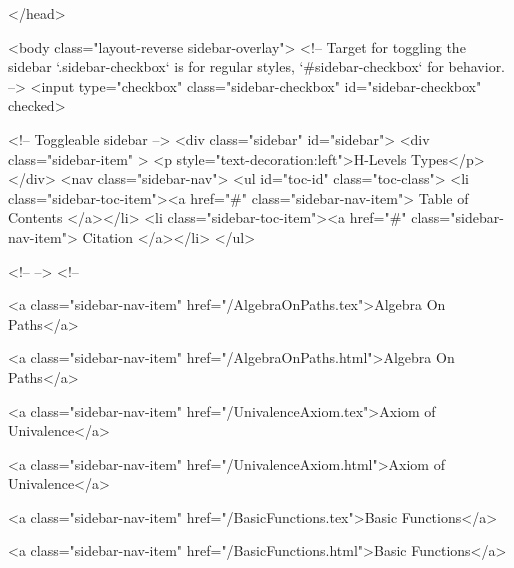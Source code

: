   
</head>




  <body class="layout-reverse sidebar-overlay">
    <!-- Target for toggling the sidebar `.sidebar-checkbox` is for regular
     styles, `#sidebar-checkbox` for behavior. -->
<input type="checkbox" class="sidebar-checkbox" id="sidebar-checkbox" checked>

<!-- Toggleable sidebar -->
<div class="sidebar" id="sidebar">
  <div class="sidebar-item" >
    <p style="text-decoration:left">H-Levels Types</p>
  </div>
  <nav class="sidebar-nav">
    <ul id="toc-id" class="toc-class">
  <li class="sidebar-toc-item"><a href="#" class="sidebar-nav-item"> Table of Contents </a></li>
  <li class="sidebar-toc-item"><a href="#" class="sidebar-nav-item"> Citation </a></li>
</ul>


    <!--  -->
    <!-- 
      
    
      
    
      
    
      
        
      
    
      
        
          <a class="sidebar-nav-item" href="/AlgebraOnPaths.tex">Algebra On Paths</a>
        
      
    
      
        
          <a class="sidebar-nav-item" href="/AlgebraOnPaths.html">Algebra On Paths</a>
        
      
    
      
        
          <a class="sidebar-nav-item" href="/UnivalenceAxiom.tex">Axiom of Univalence</a>
        
      
    
      
        
          <a class="sidebar-nav-item" href="/UnivalenceAxiom.html">Axiom of Univalence</a>
        
      
    
      
        
          <a class="sidebar-nav-item" href="/BasicFunctions.tex">Basic Functions</a>
        
      
    
      
        
          <a class="sidebar-nav-item" href="/BasicFunctions.html">Basic Functions</a>
        
      
    
